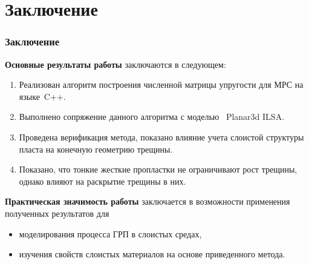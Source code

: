 \section*{Заключение}
\begin{frame}
    \frametitle{Заключение}
    \textbf{Основные результаты работы} заключаются в следующем:
    \begin{enumerate}
        \item Реализован алгоритм построения численной матрицы упругости для МРС на языке~C++.
        \item Выполнено сопряжение данного алгоритма с моделью  Planar3d ILSA.
        \item Проведена верификация метода, показано влияние учета слоистой структуры пласта на конечную геометрию трещины.
        \item Показано, что тонкие жесткие пропластки не ограничивают рост трещины, однако влияют на раскрытие трещины в них.
    \end{enumerate}

    \textbf{Практическая значимость работы} заключается в возможности применения полученных результатов для
    \begin{itemize}
        \item моделирования процесса ГРП в слоистых средах,
        \item изучения свойств слоистых материалов на основе приведенного метода.
    \end{itemize}
\end{frame}

